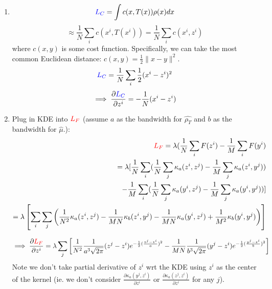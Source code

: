 \documentclass[11pt]{article}
\begin{document}
\begin{enumerate}
    \begin{enumerate}
        \item 
        $$
        \textcolor{blue}{L_C} = \int c(x,T(x)) \rho(x) dx
        $$
        $$
        \approx \frac{1}{N} \sum_i c(x^i,T(x^i))
        = \frac{1}{N} \sum_i c(x^i,z^i)
        $$
        where $c(x,y)$ is some cost function. Specifically, we can take the most common Euclidean distance: $c(x,y) = \frac{1}{2} \|x-y\|^2$.
        $$
        \textcolor{blue}{L_C} = \frac{1}{N} \sum_i \frac{1}{2}(x^i-z^i)^2
        $$
        \begin{align*}
            \implies \frac{\partial \textcolor{blue}{L_C}}{\partial z^i}
            = - \frac{1}{N}(x^i-z^i)
        \end{align*}
        
        \item Plug in KDE into $\textcolor{red}{L_F}$ (assume $a$ as the bandwidth for $\hat{\rho_T}$ and $b$ as the bandwidth for $\hat{\mu}$.):
        \begin{align*}
            \textcolor{red}{L_F} = \lambda (\frac{1}{N} \sum_i F(z^i) - \frac{1}{M} \sum_i F(y^i)\\
            =  \lambda [\frac{1}{N} \sum_i (\frac{1}{N} \sum_j \kappa_a(z^i,z^j) - \frac{1}{M} \sum_j \kappa_a(z^i,y^j))\\
            - \frac{1}{M} \sum_i (\frac{1}{N} \sum_j \kappa_a(y^i,z^j) - \frac{1}{M} \sum_j \kappa_a(y^i,y^j))]\\
            = \lambda \left[\sum_i \sum_j \left( 
            \frac{1}{N^2}\kappa_a(z^i,z^j) -  \frac{1}{MN}\kappa_b(z^i,y^j) -   \frac{1}{MN}\kappa_a(y^i,z^j) +  \frac{1}{M^2}\kappa_b(y^i,y^j)
            \right) \right]
        \end{align*}
        
        \begin{align*}
            \implies \frac{\partial \textcolor{red}{L_F}}{\partial z^i}
            = \lambda \sum_j \left[
             \frac{1}{N^2}\frac{1}{a^3\sqrt{2\pi}} (z^j-z^i) e^{-\frac{1}{2}(\frac{z^j-z^i}{a})^2} -  \frac{1}{MN}\frac{1}{b^3\sqrt{2\pi}} (y^j-z^i) e^{-\frac{1}{2}(\frac{y^j-z^i}{b})^2} \right]
        \end{align*}
        Note we don't take partial derivative of $z^i$ wrt the KDE using $z^i$ as the center of the kernel (ie. we don't consider $\frac{\partial \kappa_a(y^j,z^i)}{\partial z^i}$ or $\frac{\partial \kappa_a(z^j,z^i)}{\partial z^i}$ for any $j$).
        \end{enumerate}
    

\end{enumerate}
\end{document}
